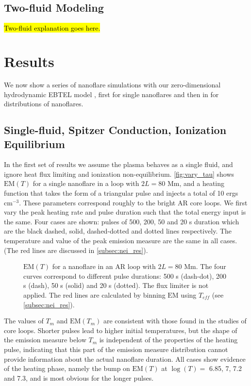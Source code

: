 \documentclass[apj]{emulateapj}
\begin{document}
	\subsection{Two-fluid Modeling}
	\label{subsec:two_fluid_theory}
	\hl{Two-fluid explanation goes here.}
	\section{Results}
	\label{sec:results}
	\par We now show a series of nanoflare simulations with our zero-dimensional hydrodynamic EBTEL model \citep{klimchuk_highly_2008, cargill_enthalpy-based_2012, cargill_enthalpy-based_2012-1, cargill_modelling_2015}, first for single nanoflares and then in  for distributions of nanoflares. 
	\subsection{Single-fluid, Spitzer Conduction, Ionization Equilibrium}
	\label{subsec:sf_sc_ie_res}
	\par In the first set of results we assume the plasma behaves as a single fluid, and ignore heat flux limiting and ionization non-equilibrium. \autoref{fig:vary_tau} shows $\mathrm{EM}(T)$ for a single nanoflare in a loop with $2L = 80$ Mm, and a heating function that takes the form of a triangular pulse and injects a total of 10 ergs cm$^{-3}$. These parameters correspond roughly to the bright AR core loops. We first vary the peak heating rate and pulse duration such that the total energy input is the same. Four cases are shown: pulses of 500, 200, 50 and 20 s duration which are the black dashed, solid, dashed-dotted and dotted lines respectively. The temperature and value of the peak emission measure are the same in all cases. (The red lines are discussed in \autoref{subsec:nei_res}).
	\begin{figure}
		\centering
		\caption{$\mathrm{EM}(T)$ for a nanoflare in an AR loop with $2L = 80$ Mm. The four curves correspond to different pulse durations: 500 s (dash-dot), 200 s (dash), 50 s (solid) and 20 s (dotted). The flux limiter is not applied. The red lines are calculated by binning $\mathrm{EM}$ using $T_{eff}$ (see \autoref{subsec:nei_res}).}
		\label{fig:vary_tau}
	\end{figure}
	\par The values of $T_m$ and $\mathrm{EM}(T_m)$ are consistent with those found in the studies of core loops. Shorter pulses lead to higher initial temperatures, but the shape of the emission measure below $T_m$ is independent of the properties of the heating pulse, indicating that this part of the emission measure distribution cannot provide information about the actual nanoflare duration.  All cases show evidence of the heating phase, namely the bump on $\mathrm{EM}(T)$ at $\log{(T)} =$ 6.85, 7, 7.2 and 7.3, and is most obvious for the longer pulses. 
\end{document}
